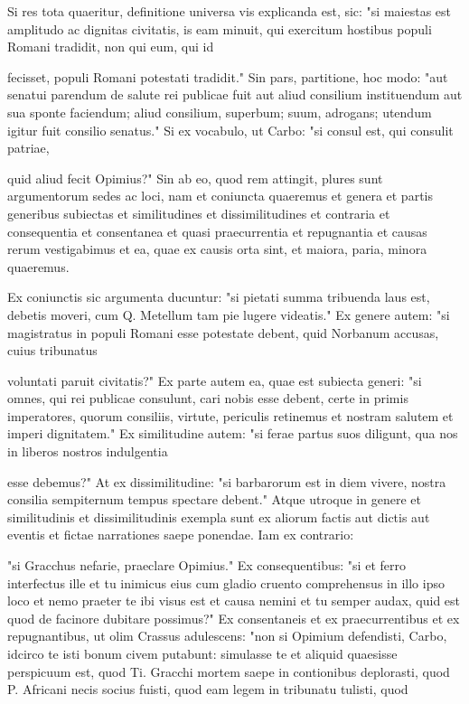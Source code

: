  Si res tota quaeritur, definitione universa vis explicanda est, sic: "si maiestas est amplitudo ac dignitas civitatis, is eam minuit, qui exercitum hostibus populi Romani tradidit, non qui eum, qui id

 fecisset, populi Romani potestati tradidit." Sin pars, partitione, hoc modo: "aut senatui parendum de salute rei publicae fuit aut aliud consilium instituendum aut sua sponte faciendum; aliud consilium, superbum; suum, adrogans; utendum igitur fuit consilio senatus." Si ex vocabulo, ut Carbo: "si consul est, qui consulit patriae,

 quid aliud fecit Opimius?" Sin ab eo, quod rem attingit, plures sunt argumentorum sedes ac loci, nam et coniuncta quaeremus et genera et partis generibus subiectas et similitudines et dissimilitudines et contraria et consequentia et consentanea et quasi praecurrentia et repugnantia et causas rerum vestigabimus et ea, quae ex causis orta sint, et maiora, paria, minora quaeremus.

 Ex coniunctis sic argumenta ducuntur: "si pietati summa tribuenda laus est, debetis moveri, cum Q. Metellum tam pie lugere videatis." Ex genere autem: "si magistratus in populi Romani esse potestate debent, quid Norbanum accusas, cuius tribunatus

 voluntati paruit civitatis?" Ex parte autem ea, quae est subiecta generi: "si omnes, qui rei publicae consulunt, cari nobis esse debent, certe in primis imperatores, quorum consiliis, virtute, periculis retinemus et nostram salutem et imperi dignitatem." Ex similitudine autem: "si ferae partus suos diligunt, qua nos in liberos nostros indulgentia

 esse debemus?" At ex dissimilitudine: "si barbarorum est in diem vivere, nostra consilia sempiternum tempus spectare debent." Atque utroque in genere et similitudinis et dissimilitudinis exempla sunt ex aliorum factis aut dictis aut eventis et fictae narrationes saepe ponendae. Iam ex contrario:

 "si Gracchus nefarie, praeclare Opimius." Ex consequentibus: "si et ferro interfectus ille et tu inimicus eius cum gladio cruento comprehensus in illo ipso loco et nemo praeter te ibi visus est et causa nemini et tu semper audax, quid est quod de facinore dubitare possimus?" Ex consentaneis et ex praecurrentibus et ex repugnantibus, ut olim Crassus adulescens: "non si Opimium defendisti, Carbo, idcirco te isti bonum civem putabunt: simulasse te et aliquid quaesisse perspicuum est, quod Ti. Gracchi mortem saepe in contionibus deplorasti, quod P. Africani necis socius fuisti, quod eam legem in tribunatu tulisti, quod

